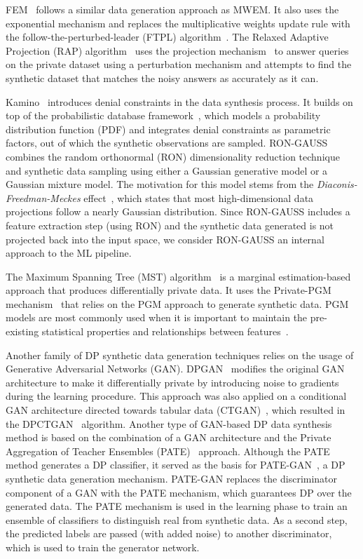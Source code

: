 FEM~\cite{vietri2020new} follows a similar data generation approach as MWEM\@.
It also uses the exponential mechanism and replaces the multiplicative weights
update rule with the follow-the-perturbed-leader (FTPL)
algorithm~\cite{kalai2005efficient}. The Relaxed Adaptive Projection (RAP)
algorithm~\cite{aydore2021differentially} uses the projection
mechanism~\cite{nikolov2013geometry} to answer queries on the private dataset
using a perturbation mechanism and attempts to find the synthetic dataset that
matches the noisy answers as accurately as it can.

Kamino~\cite{ge2021kamino} introduces denial constraints in the data synthesis
process. It builds on top of the probabilistic database
framework~\cite{de2019formal, suciu2011probabilistic}, which models a
probability distribution function (PDF) and integrates denial constraints as
parametric factors, out of which the synthetic observations are sampled.
RON-GAUSS~\cite{chanyaswad2019ron} combines the random orthonormal (RON)
dimensionality reduction technique and synthetic data sampling using either a
Gaussian generative model or a Gaussian mixture model. The motivation for this
model stems from the \textit{Diaconis-Freedman-Meckes}
effect~\cite{meckes2012projections}, which states that most high-dimensional
data projections follow a nearly Gaussian distribution. Since RON-GAUSS
includes a feature extraction step (using RON) and the synthetic data
generated is not projected back into the input space, we consider RON-GAUSS an
internal approach to the ML pipeline.

The Maximum Spanning Tree (MST) algorithm~\cite{mckenna2021winning} is a
marginal estimation-based approach that produces differentially private data.
It uses the Private-PGM mechanism~\cite{mckenna2019graphical} that relies on
the PGM approach to generate synthetic data. PGM models are most commonly used
when it is important to maintain the pre-existing statistical properties and
relationships between features~\cite{young2009using}.

Another family of DP synthetic data generation techniques relies on the usage
of Generative Adversarial Networks (GAN). DPGAN~\cite{xie2018differentially}
modifies the original GAN architecture to make it differentially private by
introducing noise to gradients during the learning procedure. This approach
was also applied on a conditional GAN architecture directed towards tabular
data (CTGAN)~\cite{xu2019modeling}, which resulted in the
DPCTGAN~\cite{rosenblatt2020differentially} algorithm. Another type of
GAN-based DP data synthesis method is based on the combination of a GAN
architecture and the Private Aggregation of Teacher Ensembles
(PATE)~\cite{papernot2017semi} approach. Although the PATE method generates a
DP classifier, it served as the basis for PATE-GAN~\cite{jordon2018pate}, a DP
synthetic data generation mechanism. PATE-GAN replaces the discriminator
component of a GAN with the PATE mechanism, which guarantees DP over the
generated data. The PATE mechanism is used in the learning phase to train an
ensemble of classifiers to distinguish real from synthetic data. As a second
step, the predicted labels are passed (with added noise) to another
discriminator, which is used to train the generator network.

